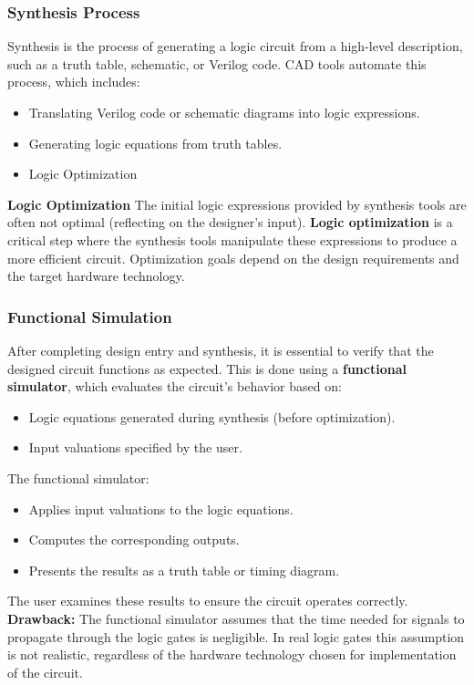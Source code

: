 \documentclass[twocolumn]{article}
\begin{document}
      \subsubsection{Synthesis Process}
      Synthesis is the process of generating a logic circuit from a high-level description, such as a truth table, schematic, or Verilog code. CAD tools automate this process, which includes:
      \begin{itemize}
        \item Translating Verilog code or schematic diagrams into logic expressions.
        \item Generating logic equations from truth tables.
        \item Logic Optimization
      \end{itemize}

      \textbf{Logic Optimization}\newline
      The initial logic expressions provided by synthesis tools are often not optimal (reflecting on the designer's input). \textbf{Logic optimization} is a critical step where the synthesis tools manipulate these expressions to produce a more efficient circuit. Optimization goals depend on the design requirements and the target hardware technology. 

\subsubsection{Functional Simulation}
      After completing design entry and synthesis, it is essential to verify that the designed circuit functions as expected. This is done using a \textbf{functional simulator}, which evaluates the circuit's behavior based on:
      \begin{itemize}
        \item Logic equations generated during synthesis (before optimization).
        \item Input valuations specified by the user.
      \end{itemize}
      The functional simulator:
      \begin{itemize}
        \item Applies input valuations to the logic equations.
        \item Computes the corresponding outputs.
        \item Presents the results as a truth table or timing diagram.
      \end{itemize}
      The user examines these results to ensure the circuit operates correctly.
      \textbf{Drawback: }The functional simulator assumes that the time needed for signals to propagate through the logic gates is negligible. In real logic gates this assumption is not realistic, regardless of the hardware technology chosen for implementation of the circuit.
\end{document}

